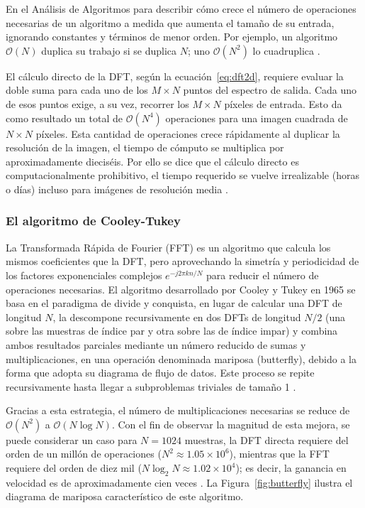 \documentclass[conference]{IEEEtran}
\begin{document}
En el Análisis de Algoritmos para describir cómo crece el número de operaciones necesarias de un
algoritmo a medida que aumenta el tamaño de su entrada, ignorando constantes y
términos de menor orden. Por ejemplo, un algoritmo $\mathcal{O}(N)$ duplica su
trabajo si se duplica $N$; uno $\mathcal{O}(N^2)$ lo cuadruplica
\cite{cooley1967}.

El cálculo directo de la DFT, según la ecuación~\eqref{eq:dft2d}, requiere
evaluar la doble suma para cada uno de los $M \times N$ puntos del espectro de
salida. Cada uno de esos puntos exige, a su vez, recorrer los $M \times N$
píxeles de entrada. Esto da como resultado un total de
$\mathcal{O}(N^4)$ operaciones para una imagen cuadrada de $N \times N$ píxeles.
Esta cantidad de operaciones crece rápidamente al duplicar
la resolución de la imagen, el tiempo de cómputo se multiplica por
aproximadamente dieciséis. Por ello se dice que el cálculo directo es computacionalmente prohibitivo, el tiempo requerido se vuelve irrealizable (horas o días) incluso para imágenes de resolución media \cite{cooley1967}.

\subsubsection{El algoritmo de Cooley-Tukey}
\label{sec:cooley_tukey}

La Transformada Rápida de Fourier (FFT) es un algoritmo que calcula los mismos coeficientes que la DFT, pero aprovechando la simetría y
periodicidad de los factores exponenciales complejos $e^{-j2\pi kn/N}$ para
reducir el número de operaciones necesarias. El algoritmo
desarrollado por Cooley y Tukey en 1965 se basa en el paradigma de divide y conquista, en lugar de calcular una DFT de longitud $N$, la
descompone recursivamente en dos DFTs de longitud $N/2$ (una sobre las muestras de índice par y otra sobre las de índice impar) y combina ambos resultados parciales mediante un número reducido de sumas y multiplicaciones, en una
operación denominada mariposa (butterfly), debido a la forma
que adopta su diagrama de flujo de datos. Este proceso se repite recursivamente hasta llegar a subproblemas triviales de tamaño 1
\cite{cooley1967}.

Gracias a esta estrategia, el número de multiplicaciones necesarias se reduce
de $\mathcal{O}(N^2)$ a $\mathcal{O}(N \log N)$. Con el fin de observar la magnitud de esta mejora, se puede considerar un caso
para $N = 1024$ muestras, la DFT directa requiere del orden de un
millón de operaciones ($N^2 \approx 1.05 \times 10^6$), mientras que la FFT requiere del orden de diez mil ($N \log_2 N \approx 1.02 \times 10^4$); es
decir, la ganancia en velocidad es de aproximadamente cien veces
\cite{cooley1967}. La
Figura~\ref{fig:butterfly} ilustra el diagrama de mariposa característico de este algoritmo.
\end{document}

